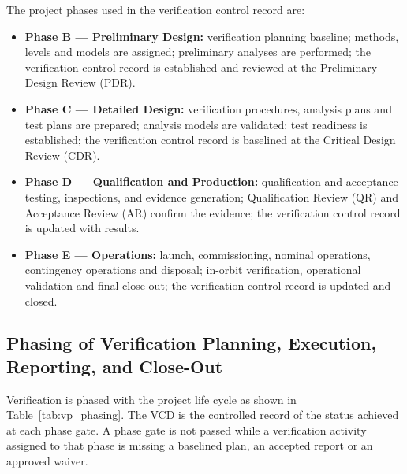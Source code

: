 The project phases used in the verification control record are:
\begin{itemize}
    \item \textbf{Phase B --- Preliminary Design:} verification planning baseline; methods, levels and models are assigned; preliminary analyses are performed; the verification control record is established and reviewed at the Preliminary Design Review (PDR).
    \item \textbf{Phase C --- Detailed Design:} verification procedures, analysis plans and test plans are prepared; analysis models are validated; test readiness is established; the verification control record is baselined at the Critical Design Review (CDR).
    \item \textbf{Phase D --- Qualification and Production:} qualification and acceptance testing, inspections, and evidence generation; Qualification Review (QR) and Acceptance Review (AR) confirm the evidence; the verification control record is updated with results.
    \item \textbf{Phase E --- Operations:} launch, commissioning, nominal operations, contingency operations and disposal; in-orbit verification, operational validation and final close-out; the verification control record is updated and closed.
\end{itemize}

\subsection{Phasing of Verification Planning, Execution, Reporting, and Close-Out}

Verification is phased with the project life cycle as shown in Table~\ref{tab:vp_phasing}. The VCD is the controlled record of the status achieved at each phase gate. A phase gate is not passed while a verification activity assigned to that phase is missing a baselined plan, an accepted report or an approved waiver.

